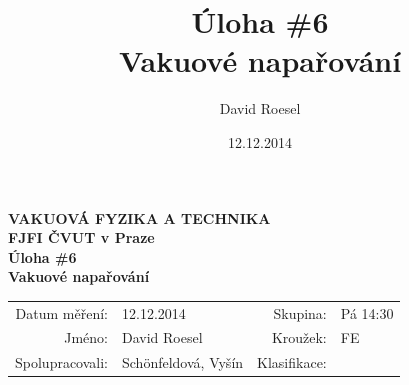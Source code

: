 \documentclass[english]{article}
\newcommand{\Author}{David Roesel}
\newcommand{\Coauthor}{Schönfeldová, Vyšín}
\newcommand{\Institute}{FJFI ČVUT v Praze}
\newcommand{\Subject}{VAKUOVÁ FYZIKA A TECHNIKA}
\newcommand{\Group}{Pá 14:30}
\newcommand{\Kruh}{FE}
\newcommand{\Title}{Úloha \#6  \\Vakuové napařování}
\newcommand{\Date}{12.12.2014}
\begin{document}
\author{\Author}
\title{\Title}
\date{\Date}

\renewcommand{\figurename}{Obr.}
\renewcommand{\tablename}{Tab.}
\renewcommand{\refname}{Reference}


\setlength{\parindent}{0cm}
\begin{multicols}{2}
\textbf{\Subject \\
        \Institute \\[0.1cm]
\Title \\[0.5cm]
}
\begin{tabular}{rlrl}
\large Datum měření: & \Date & \large Skupina: & \Group \\
\large Jméno: & \Author & \large Kroužek:  & \Kruh\\
\large Spolupracovali: & \Coauthor &\large Klasifikace:\\
\end{tabular}


\end{multicols}
\end{document}
